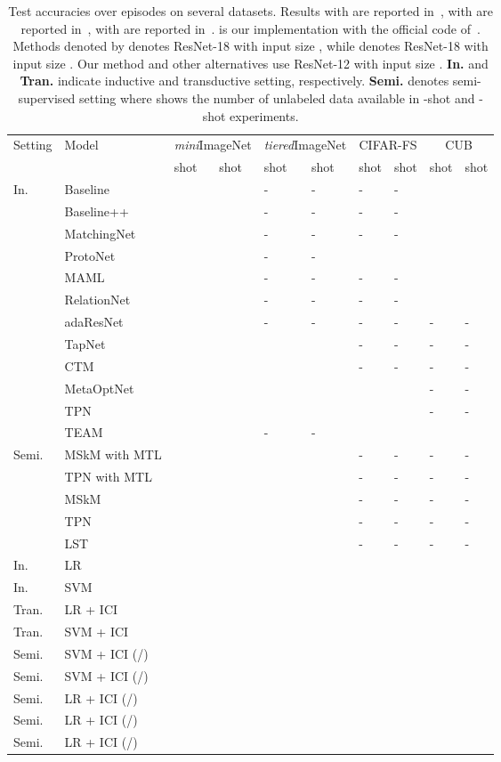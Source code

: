 \documentclass[10pt,letterpaper,twocolumn]{article}
\providecommand{\tabularnewline}{\\}
\begin{document}
\begin{table*}
\centering
\begin{tabular*}{\textwidth}{@{\extracolsep{\fill}}llllllllll}
\toprule 
\multirow{2}{*}{Setting} & \multirow{2}{*}{Model} &  \multicolumn{2}{c}{\emph{mini}ImageNet} & \multicolumn{2}{c}{\emph{tiered}ImageNet} & \multicolumn{2}{c}{CIFAR-FS} & \multicolumn{2}{c}{CUB}\tabularnewline
 & &shot & shot & shot & shot & shot & shot & shot & shot\tabularnewline
\midrule
\multirow{11}{*}{In.}
&Baseline~\cite{DBLP:journals/corr/abs-1904-04232} &  &  & - & - & - & - &  & \tabularnewline
& Baseline++~\cite{DBLP:journals/corr/abs-1904-04232}& & & - & - & - & - &  & \tabularnewline
& MatchingNet~\cite{vinyals2016matching}&  &  & - & - & - & - &  & \tabularnewline
& ProtoNet~\cite{snell2017prototypical}&  &  & - & - &  &  &  & \tabularnewline
& MAML~\cite{finn2017model}& &  & - & - & - & - &  & \tabularnewline
&RelationNet~\cite{sung2018learning} &  &  & - & - & - & - &  & \tabularnewline
& adaResNet~\cite{munkhdalai2017rapid}&  &  & - & - & - & - & - & -\tabularnewline
& TapNet~\cite{yoon2019tapnet} &  &  & &   & - & - & - & -\tabularnewline
& CTM~\cite{li2019finding} &  &  &  &   & - & - & - & -\tabularnewline
&MetaOptNet~\cite{lee2019meta}&&&&&&&-&-\tabularnewline
\midrule

\multirow{2}{*}{Tran.}
&TPN~\cite{liu2018learning} &  &  &  &  &  &  & - & -\tabularnewline
&TEAM~\cite{qiao2019transductive}  &  &  & - & - &  &  &  &  \tabularnewline
\midrule
\multirow{4}{*}{Semi.}
&MSkM with MTL &  &  &  &   & - & - & - &- \tabularnewline
&TPN with MTL &  &  &  &  & - & - & - & -\tabularnewline
&MSkM~\cite{ren2018meta}& &  &  &  & - & - & - &  - \tabularnewline
&TPN~\cite{liu2018learning}& &  &  &  & - & - & - & -  \tabularnewline
&LST~\cite{sun2019learning}& &  &  &  & - & - & - & -  \tabularnewline
\midrule 
\midrule 
In. &LR &  &  &  &  &  &  &  & \tabularnewline
In. &SVM &  &  &  & &  &  &  & \tabularnewline
\midrule 
Tran.&LR + ICI &  &  &  &  &  &  &  & \tabularnewline
Tran. &SVM + ICI &  &  &  & &  &  &  &  \tabularnewline
\midrule 
Semi. &SVM + ICI (/) &  &  &  &  &  &  &  & \tabularnewline
Semi. &SVM + ICI (/) &  &  &  & &  &  &   & \tabularnewline
Semi. &LR + ICI (/) &  &  &  & &  &  &  &  \tabularnewline
Semi. &LR + ICI (/) &  &  &  & &   &  &  & \tabularnewline
Semi. &LR + ICI (/) &  &  &  & &  &  &  & \tabularnewline
\bottomrule
\end{tabular*}
\vspace{0.01mm}
\caption{\label{fig:tfsl results} Test accuracies over  episodes on several datasets.  
Results with  are reported in~\cite{DBLP:journals/corr/abs-1904-04232}, 
with  are reported in~\cite{sun2019learning}, 
with  are reported in~\cite{lee2019meta}.
 is our implementation with the official code of~\cite{liu2018learning}. 
Methods denoted by  denotes ResNet-18 with input size , while  denotes ResNet-18 with input size . 
Our method and other alternatives use ResNet-12 with input size .
\textbf{In.} and \textbf{Tran.} indicate inductive and transductive setting, respectively. 
\textbf{Semi.} denotes semi-supervised setting where  shows the number of unlabeled data available in -shot and -shot experiments.
}
\end{table*}
  
\end{document}
